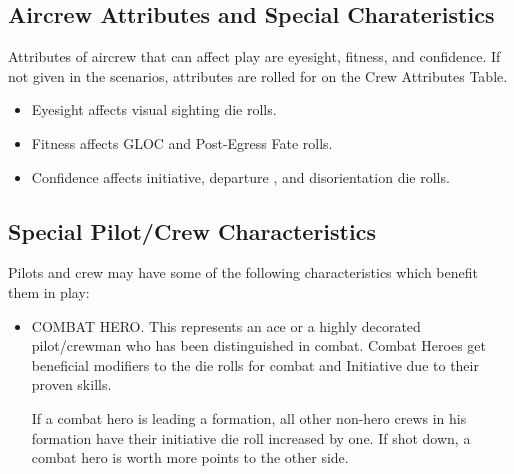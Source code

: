 \begin{advancedrules}
    \section{Aircrew Attributes and Special Charateristics}
    \label{rule:crew-attributes}
    \label{rule:crew-characteristics}

    Attributes of aircrew that can affect play are eyesight, fitness, and confidence. If not given in the scenarios, attributes are rolled for on the Crew Attributes Table.

    \begin{itemize}
        \item Eyesight affects visual sighting die rolls.
        \item Fitness affects GLOC and Post-Egress Fate rolls.
        \item Confidence affects initiative, departure , and disorientation die rolls.
    \end{itemize}

    \subsection{Special Pilot/Crew Characteristics} Pilots and crew may have some of the following characteristics which benefit them in play:

    \begin{itemize}

        \item COMBAT HERO. This represents an ace or a highly decorated pilot/crewman who has been distinguished in combat. Combat Heroes get beneficial modifiers to the die rolls for combat and Initiative due to their proven skills.

            If a combat hero is leading a formation, all other non-hero crews in his formation have their initiative die roll increased by one.  If shot down, a combat hero is worth more points to the other side. 


\end{itemize}
\end{advancedrules}
